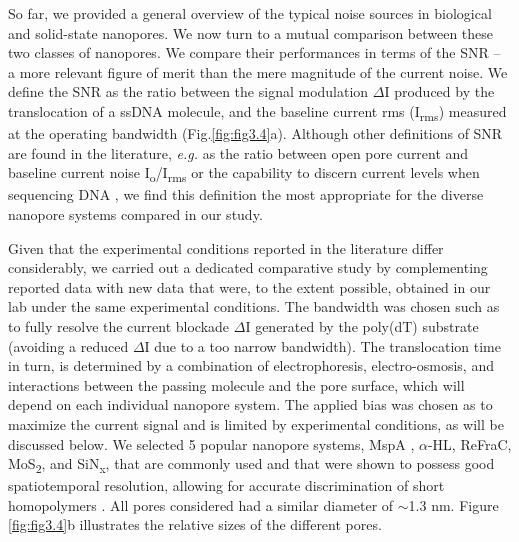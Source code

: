 So far, we provided a general overview of the typical noise sources in biological and solid-state nanopores. We now turn to a mutual comparison between these two classes of nanopores. We compare their performances in terms of the SNR – a more relevant figure of merit than the mere magnitude of the current noise. We define the SNR as the ratio between the signal modulation $\Delta$I produced by the translocation of a ssDNA molecule, and the baseline current rms (I\textsubscript{rms}) measured at the operating bandwidth (Fig.\ref{fig:fig3.4}a). Although other definitions of SNR are found in the literature, \emph{e.g.} as the ratio between open pore current and baseline current noise I\textsubscript{o}/I\textsubscript{rms} \cite{Rosenstein2013} or the capability to discern current levels when sequencing DNA \cite{Manrao2012,Laszlo2016}, we find this definition the most appropriate for the diverse nanopore systems compared in our study.

Given that the experimental conditions reported in the literature differ considerably, we carried out a dedicated comparative study by complementing reported data with new data that were, to the extent possible, obtained in our lab under the same experimental conditions. The bandwidth was chosen such as to fully resolve the current blockade $\Delta$I generated by the poly(dT) substrate (avoiding a reduced $\Delta$I due to a too narrow bandwidth). The translocation time in turn, is determined by a combination of electrophoresis, electro-osmosis, and interactions between the passing molecule and the pore surface, which will depend on each individual nanopore system. The applied bias was chosen as to maximize the current signal and is limited by experimental conditions, as will be discussed below. We selected 5 popular nanopore systems, MspA , $\alpha$-HL, ReFraC, MoS\textsubscript{2}, and SiN\textsubscript{x}, that are commonly used and that were shown to possess good spatiotemporal resolution, allowing for accurate discrimination of short homopolymers \cite{Manrao2012,Feng2015,Venta2013,Wloka2016,Manrao2010}. All pores considered had a similar diameter of $\sim$1.3 nm. Figure \ref{fig:fig3.4}b illustrates the relative sizes of the different pores.

